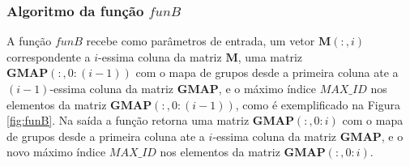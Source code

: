 \documentclass[a4paper,10pt]{article}
\begin{document}
\subsubsection{Algoritmo da função $funB$}
\label{subsubsec:funB}
A função $funB$ recebe como parâmetros de entrada, um vetor $\mathbf{M}(:,i)$ correspondente a 
$i$-essima coluna da matriz $\mathbf{M}$, uma matriz $\mathbf{GMAP}(:,0:(i-1))$ com o mapa de grupos
desde a primeira coluna ate a $(i-1)$-essima coluna da matriz $\mathbf{GMAP}$, 
e o máximo índice $MAX\_ID$ nos elementos da matriz $\mathbf{GMAP}(:,0:(i-1))$, 
como é exemplificado na
Figura \ref{fig:funB}. Na saída a função retorna uma matriz $\mathbf{GMAP}(:,0:i)$ com o mapa de grupos
desde a primeira coluna ate a $i$-essima coluna da matriz $\mathbf{GMAP}$, 
e o novo máximo índice $MAX\_ID$ nos elementos da matriz $\mathbf{GMAP}(:,0:i)$.
\end{document}
